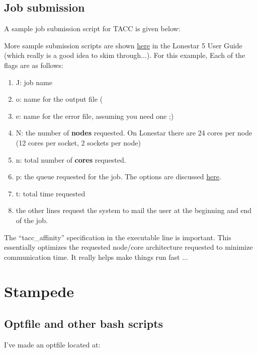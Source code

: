 \documentclass[a4paper,11pt]{article}
\begin{document}
	\subsection{Job submission} 

	A sample job submission script for TACC is given below: 
	
	

	More sample submission scripts are shown \href{https://portal.tacc.utexas.edu/user-guides/lonestar5#submit-a-batch-job-with-sbatch}{here} in the Lonestar 5 User Guide (which really is a good idea to skim through...). For this example, Each of the flags are as follows: 
	\begin{enumerate}
	  \item J: job name
	  \item o: name for the output file (%
	  \item e: name for the error file, assuming you need one ;) 
	  \item N: the number of \textbf{nodes} requested. On Lonestar there are 24 cores per node (12 cores per socket, 2 sockets per node) 
	  \item n: total number of \textbf{cores} requested.
	  \item p: the queue requested for the job. The options are discussed \href{https://portal.tacc.utexas.edu/user-guides/lonestar5#production-queues}{here}.
	  \item t: total time requested 
	  \item the other lines request the system to mail the user at the beginning and end of the job.
	\end{enumerate}

	The ``tacc\_affinity'' specification in the executable line is important. This essentially optimizes the requested node/core architecture requested to minimize communication time. It really helps make things run fast ...



\section{Stampede}

	\subsection{Optfile and other bash scripts}
	
	I've made an optfile located at: 
	
\end{document}
